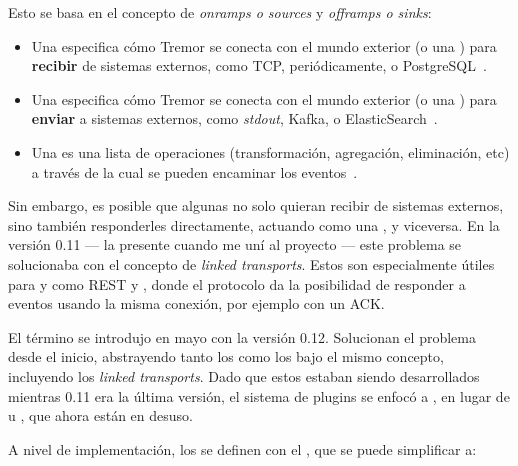 Esto se basa en el concepto de \emph{onramps o sources} y \emph{offramps o
sinks}:

\begin{itemize}
    \item Una \onramp especifica cómo Tremor se conecta con el mundo exterior (o
        una \pipeline) para \textbf{recibir} de sistemas externos, como TCP,
        periódicamente, o PostgreSQL~\cite{tremoronramps}.

    \item Una \offramp especifica cómo Tremor se conecta con el mundo exterior
        (o una \pipeline) para \textbf{enviar} a sistemas externos, como
        \emph{stdout}, Kafka, o ElasticSearch~\cite{tremorofframps}.

    \item Una \pipeline es una lista de operaciones (transformación, agregación,
        eliminación, etc) a través de la cual se pueden encaminar los
        eventos~\cite{tremorpipelines}.

\end{itemize}

Sin embargo, es posible que algunas \onramps no solo quieran recibir de sistemas
externos, sino también responderles directamente, actuando como una \offramp, y
viceversa. En la versión 0.11 --- la presente cuando me uní al proyecto --- este
problema se solucionaba con el concepto de \emph{linked transports}. Estos son
especialmente útiles para \onramps y \offramps como REST y \websockets, donde el
protocolo da la posibilidad de responder a eventos usando la misma conexión, por
ejemplo con un ACK.

El término \connector se introdujo en mayo con la versión 0.12. Solucionan el
problema desde el inicio, abstrayendo tanto los \onramps como los \offramps bajo
el mismo concepto, incluyendo los \emph{linked transports}. Dado que estos
estaban siendo desarrollados mientras 0.11 era la última versión, el sistema de
plugins se enfocó a \connectors, en lugar de \onramps u \offramps, que ahora
están en desuso.

A nivel de implementación, los \connector se definen con el \trait
{}, que se puede simplificar a:

